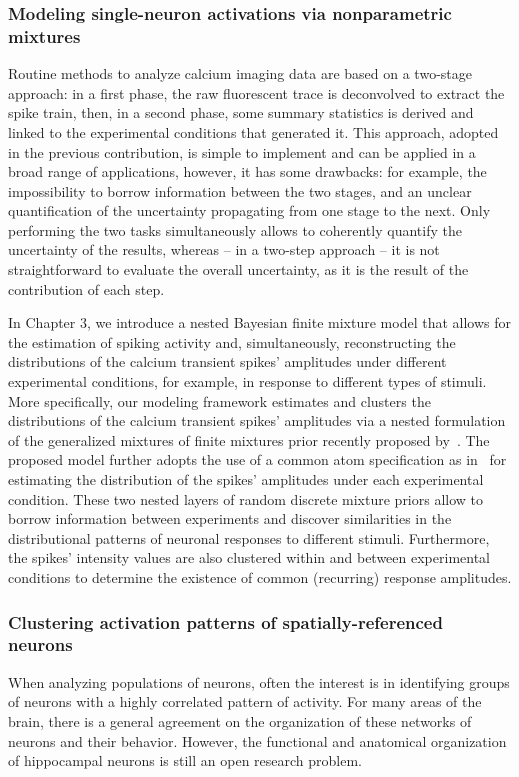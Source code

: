 \subsubsection{Modeling single-neuron activations via nonparametric mixtures}
Routine methods to analyze calcium imaging data are based on a two-stage approach: in a first phase, the raw fluorescent trace is deconvolved to extract the spike train, then, in a second phase, some summary statistics is derived and linked to the experimental conditions that generated it. 
This approach, adopted in the previous contribution, is simple to implement and can be applied in a broad range of applications, however, it has some drawbacks: for example, the impossibility to borrow information between the two stages, and an unclear quantification of the uncertainty propagating from one stage to the next. Only performing the two tasks simultaneously allows to coherently quantify the uncertainty of the results, whereas -- in a two-step approach -- it is not straightforward to evaluate the overall uncertainty, as it is the result of the contribution of each step. 

In Chapter 3, we introduce a nested Bayesian finite mixture model that allows for the estimation of spiking activity and, simultaneously, reconstructing the distributions of the calcium transient spikes' amplitudes under different experimental conditions, for example, in response to different types of stimuli.
More specifically, our modeling framework estimates and clusters the distributions of the calcium transient spikes’ amplitudes via a nested formulation of the generalized mixtures of finite mixtures prior recently proposed by~\textcite{fruhwirthschnatter2020}. The proposed model further adopts the use of a common atom specification as in~\textcite{denti2021} for estimating the distribution of the spikes’ amplitudes under each experimental condition. 
These two nested layers of random discrete mixture priors allow to borrow information between experiments and discover similarities in the distributional patterns of neuronal responses to different stimuli. Furthermore, the spikes’ intensity values are also clustered within and between experimental conditions to determine the existence of common (recurring) response amplitudes.




\subsubsection{Clustering activation patterns of spatially-referenced neurons}
When analyzing populations of neurons, often the interest is in identifying groups of neurons with a highly correlated pattern of activity. For many areas of the brain, there is a general agreement on the organization of these networks of neurons and their behavior.
However, the functional and anatomical organization of hippocampal neurons is still an open research problem. 

